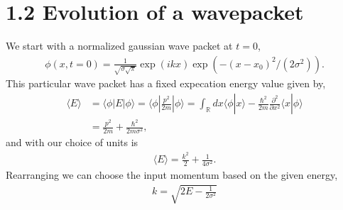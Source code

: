 \documentclass[singlepage,notitlepage,nofootinbib,11pt]{revtex4-1}
\newcommand{\eq}[1]{\begin{align*}#1\end{align*}}
\def\<{\langle}
\def\>{\rangle}
\begin{document}
\section*{1.2 Evolution of a wavepacket}
We start with a normalized gaussian wave packet at $t=0$,
\eq{
\phi(x,t=0) = \frac{1}{\sqrt{\sigma \sqrt{\pi}}}\exp\left(ikx\right)\exp\left(-(x-x_0)^2/\left(2\sigma^2\right)\right).
}
This particular wave packet has a fixed expecation energy value given by,
\begin{align*}
  \<E\> &= \<\phi|E|\phi\> = \<\phi|\frac{p^2}{2m}|\phi\> = \int_{\mathbb{R}}dx\<\phi|x\>-\frac{\hbar^2}{2m}\frac{\partial^2}{\partial x^2}\<x|\phi\> \\
  &= \frac{p^2}{2m} + \frac{\hbar^2}{2 m \sigma^2},
\end{align*}
and with our choice of units is
\eq{
\<E\> = \frac{k^2}{2} +  \frac{1}{4\sigma^2}.
}
Rearranging we can choose the input momentum based on the given energy,
\eq{
k = \sqrt{2 E - \frac{1}{2\sigma^2}}
  }
\end{document}
